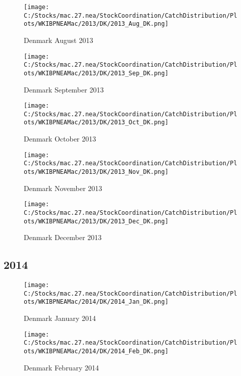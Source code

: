 \documentclass{article}
\begin{document}
\begin{figure}
	\centering
		\texttt{[image: C:/Stocks/mac.27.nea/StockCoordination/CatchDistribution/Plots/WKIBPNEAMac/2013/DK/2013\_Aug\_DK.png]}
	\caption{Denmark August 2013}
	\label{fig:2013_Aug_DK}
\end{figure}

\begin{figure}
	\centering
		\texttt{[image: C:/Stocks/mac.27.nea/StockCoordination/CatchDistribution/Plots/WKIBPNEAMac/2013/DK/2013\_Sep\_DK.png]}
	\caption{Denmark September 2013}
	\label{fig:2013_Sep_DK}
\end{figure}

\begin{figure}
	\centering
		\texttt{[image: C:/Stocks/mac.27.nea/StockCoordination/CatchDistribution/Plots/WKIBPNEAMac/2013/DK/2013\_Oct\_DK.png]}
	\caption{Denmark October 2013}
	\label{fig:2013_Oct_DK}
\end{figure}

\begin{figure}
	\centering
		\texttt{[image: C:/Stocks/mac.27.nea/StockCoordination/CatchDistribution/Plots/WKIBPNEAMac/2013/DK/2013\_Nov\_DK.png]}
	\caption{Denmark November 2013}
	\label{fig:2013_Nov_DK}
\end{figure}

\begin{figure}
	\centering
		\texttt{[image: C:/Stocks/mac.27.nea/StockCoordination/CatchDistribution/Plots/WKIBPNEAMac/2013/DK/2013\_Dec\_DK.png]}
	\caption{Denmark December 2013}
	\label{fig:2013_Dec_DK}
\end{figure}

\clearpage

\newpage

\subsection{2014}



\begin{figure}[h]
	\centering
		\texttt{[image: C:/Stocks/mac.27.nea/StockCoordination/CatchDistribution/Plots/WKIBPNEAMac/2014/DK/2014\_Jan\_DK.png]}
	\caption{Denmark January 2014}
	\label{fig:2014_Jan_DK}
\end{figure}

\begin{figure}
	\centering
		\texttt{[image: C:/Stocks/mac.27.nea/StockCoordination/CatchDistribution/Plots/WKIBPNEAMac/2014/DK/2014\_Feb\_DK.png]}
	\caption{Denmark February 2014}
	\label{fig:2014_Feb_DK}
\end{figure}
\end{document}
